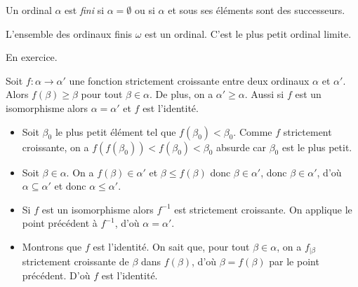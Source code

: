 \documentclass[./main]{subfiles}
\begin{document}
  \begin{defn}
    Un ordinal $\alpha$ est \textit{fini} si $\alpha = \emptyset$ ou si $\alpha$ et sous ses éléments sont des successeurs.
  \end{defn}

  \begin{prop}
    L'ensemble des ordinaux finis $\omega$ est un ordinal. C'est le plus petit ordinal limite.
  \end{prop}
  \begin{prv}
    En exercice.
  \end{prv}

  \begin{lem}
    Soit $f : \alpha \to \alpha'$ une fonction strictement croissante entre deux ordinaux $\alpha$ et $\alpha'$.
    Alors $f(\beta) \ge \beta$ pour tout $\beta \in \alpha$.
    De plus, on a $\alpha' \ge \alpha$.
    Aussi si $f$ est un isomorphisme alors $\alpha = \alpha'$ et  $f$ est l'identité.
  \end{lem}

  \begin{prv}
    \begin{itemize}
      \item Soit $\beta_0$ le plus petit élément tel que $f(\beta_0) < \beta_0$.
        Comme $f$ strictement croissante, on a $f(f(\beta_0)) < f(\beta_0) < \beta_0$ absurde car $\beta_0$ est le plus petit.
      \item Soit $\beta \in \alpha$. On a $f(\beta) \in \alpha'$ et $\beta \le f(\beta)$ donc $\beta \in \alpha'$, donc $\beta \in \alpha'$, d'où $\alpha \subseteq \alpha'$ et donc $\alpha \le \alpha'$.
      \item Si $f$ est un isomorphisme alors $f^{-1}$ est strictement croissante.
        On applique le point précédent à $f^{-1}$, d'où $\alpha = \alpha'$.
      \item Montrons que $f$ est l'identité.
        On sait que, pour tout $\beta \in \alpha$, on a $f_{|\beta}$ strictement croissante de $\beta$ dans $f(\beta)$, d'où $\beta = f(\beta)$ par le point précédent.
        D'où $f$ est l'identité.
    \end{itemize}
  \end{prv}
\end{document}
